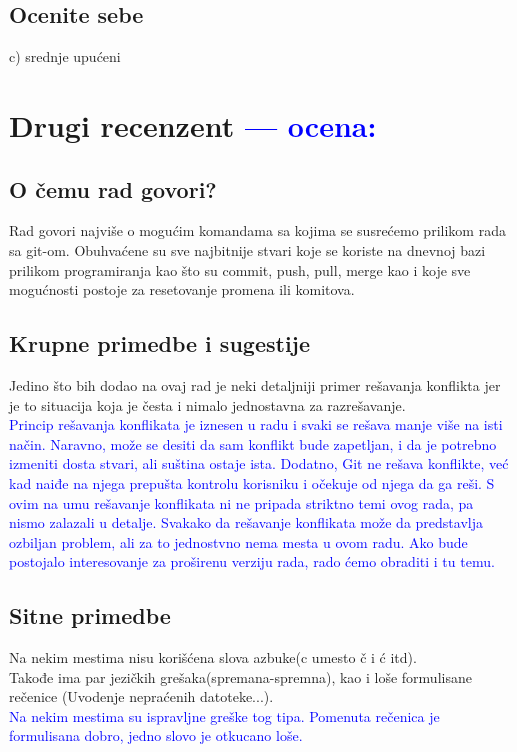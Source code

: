 \documentclass[a4paper]{report}
\newcommand{\odgovor}[1]{\textcolor{blue}{#1}}
\begin{document}
\section{Ocenite sebe}
 c) srednje upućeni



\chapter{Drugi recenzent \odgovor{--- ocena:} }

\section{O čemu rad govori?}
Rad govori najviše o mogućim komandama sa kojima se susrećemo prilikom rada sa git-om. Obuhvaćene su sve najbitnije stvari koje se koriste na dnevnoj bazi prilikom programiranja kao što su commit, push, pull, merge kao i koje sve mogućnosti postoje za resetovanje promena ili komitova. 
\section{Krupne primedbe i sugestije}
Jedino što bih dodao na ovaj rad je neki detaljniji primer rešavanja konflikta jer je to situacija koja je česta i nimalo jednostavna za razrešavanje.\\
\odgovor{Princip rešavanja konflikata je iznesen u radu i svaki se rešava manje više na isti način. Naravno, može se desiti da sam konflikt bude zapetljan, i da je potrebno izmeniti dosta stvari, ali suština ostaje ista. Dodatno, Git ne rešava konflikte, već kad naiđe na njega prepušta kontrolu korisniku i očekuje od njega da ga reši. S ovim na umu rešavanje konflikata ni ne pripada striktno temi ovog rada, pa nismo zalazali u detalje. Svakako da rešavanje konflikata može da predstavlja ozbiljan problem, ali za to jednostvno nema mesta u ovom radu. Ako bude postojalo interesovanje za proširenu verziju rada, rado ćemo obraditi i tu temu.}
\section{Sitne primedbe}
Na nekim mestima nisu korišćena slova azbuke(c umesto č i ć itd). \\
Takođe ima par jezičkih grešaka(spremana-spremna), kao i loše formulisane rečenice (Uvodenje nepraćenih datoteke...). \\
\odgovor{Na nekim mestima su ispravljne greške tog tipa. Pomenuta rečenica je formulisana dobro, jedno slovo je otkucano loše.}\\
\end{document}
